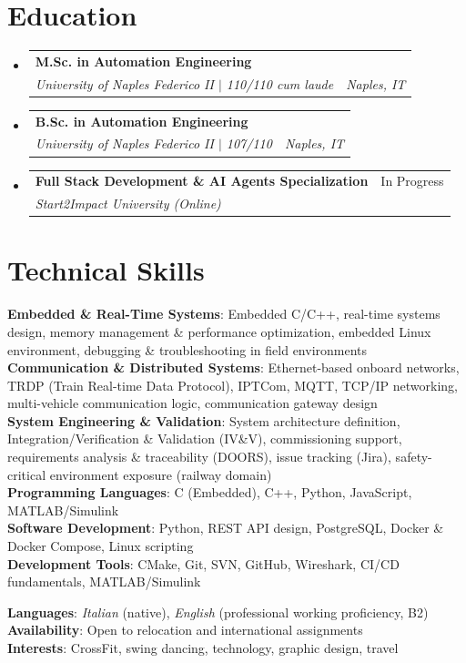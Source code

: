 \documentclass[letterpaper,10pt]{article}
\makeatletter
\newcommand{\resumeSubheading}[4]{
  \vspace{-2pt}\item
    \begin{tabular*}{0.97\textwidth}[t]{l@{\extracolsep{\fill}}r}
      \textbf{#1} & #2 \\
      \textit{\small#3} & \textit{\small #4} \\
    \end{tabular*}\vspace{-3pt}
}
\newcommand{\resumeSubHeadingListStart}{\begin{itemize}[leftmargin=0.15in, label={}]\vspace{2pt}}
\newcommand{\resumeSubHeadingListEnd}{\end{itemize}}
\makeatother
\begin{document}
\section{Education}
  \resumeSubHeadingListStart
    \resumeSubheading
      {M.Sc. in Automation Engineering}{}
      {University of Naples Federico II $|$ 110/110 cum laude}{Naples, IT}
    \resumeSubheading
      {B.Sc. in Automation Engineering}{}
      {University of Naples Federico II $|$ 107/110}{Naples, IT}
    \resumeSubheading
      {Full Stack Development \& AI Agents Specialization}{In Progress}
      {Start2Impact University (Online)}{}
  \resumeSubHeadingListEnd

\section{Technical Skills}
 \begin{itemize}[leftmargin=0.15in, label={}]
    \small{\item{
     \textbf{Embedded \& Real-Time Systems}{: Embedded C/C++, real-time systems design, memory management \& performance optimization, embedded Linux environment, debugging \& troubleshooting in field environments} \\
     \textbf{Communication \& Distributed Systems}{: Ethernet-based onboard networks, TRDP (Train Real-time Data Protocol), IPTCom, MQTT, TCP/IP networking, multi-vehicle communication logic, communication gateway design} \\
     \textbf{System Engineering \& Validation}{: System architecture definition, Integration/Verification \& Validation (IV\&V), commissioning support, requirements analysis \& traceability (DOORS), issue tracking (Jira), safety-critical environment exposure (railway domain)} \\
     \textbf{Programming Languages}{: C (Embedded), C++, Python, JavaScript, MATLAB/Simulink} \\
     \textbf{Software Development}{: Python, REST API design, PostgreSQL, Docker \& Docker Compose, Linux scripting} \\
     \textbf{Development Tools}{: CMake, Git, SVN, GitHub, Wireshark, CI/CD fundamentals, MATLAB/Simulink}
    }}
 \end{itemize}
 \textbf{Languages}: \textit{Italian} (native), \textit{English} (professional working proficiency, B2) \\
 \textbf{Availability}: Open to relocation and international assignments \\
 \textbf{Interests}: CrossFit, swing dancing, technology, graphic design, travel
\end{document}
